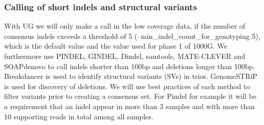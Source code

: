 \subsubsection{Calling of short indels and structural variants}
With UG we will only make a call in the low coverage data, if the number of consensus indels exceeds a threshold of 5 (--min\_indel\_count\_for\_genotyping 5), which is the default value and the value used for phase 1 of 1000G.
We furthermore use PINDEL, GINDEL, Dindel, samtools, MATE-CLEVER and SOAPdenovo to call indels shorter than 100bp and deletions longer than 100bp. Breakdancer is used to identify structural variants (SVs) in trios. GenomeSTRiP is used for discovery of deletions. We will use best practices of each method to filter variants prior to creating a consensus set. For Pindel for example it will be a requirement that an indel appear in more than 3 samples and with more than 10 supporting reads in total among all samples.

